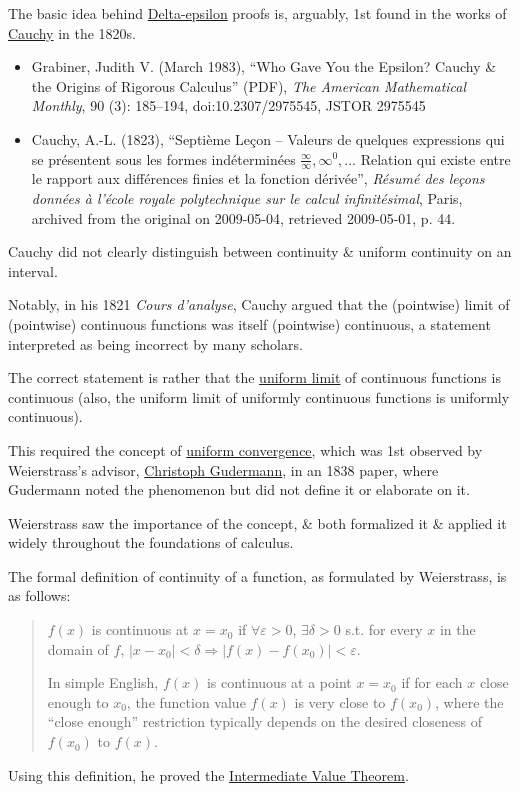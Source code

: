 \documentclass{article}
\begin{document}
%
The basic idea behind \href{https://en.wikipedia.org/wiki/(%CE%B5,_%CE%B4)-definition_of_limit}{Delta-epsilon} proofs is, arguably, 1st found in the works of \href{https://en.wikipedia.org/wiki/Augustin-Louis_Cauchy}{Cauchy} in the 1820s.
\begin{itemize}
	\item Grabiner, Judith V. (March 1983), ``Who Gave You the Epsilon? Cauchy \& the Origins of Rigorous Calculus'' (PDF), \textit{The American Mathematical Monthly}, 90 (3): 185--194, doi:10.2307/2975545, JSTOR 2975545
	\item Cauchy, A.-L. (1823), ``Septième Leçon – Valeurs de quelques expressions qui se présentent sous les formes indéterminées $\frac{\infty}{\infty},\infty^0,\ldots$ Relation qui existe entre le rapport aux différences finies et la fonction dérivée'', \textit{Résumé des leçons données à l'école royale polytechnique sur le calcul infinitésimal}, Paris, archived from the original on 2009-05-04, retrieved 2009-05-01, p. 44.
\end{itemize}
Cauchy did not clearly distinguish between continuity \& uniform continuity on an interval.

Notably, in his 1821 \textit{Cours d'analyse}, Cauchy argued that the (pointwise) limit of (pointwise) continuous functions was itself (pointwise) continuous, a statement interpreted as being incorrect by many scholars.

The correct statement is rather that the \href{https://en.wikipedia.org/wiki/Uniform_limit}{uniform limit} of continuous functions is continuous (also, the uniform limit of uniformly continuous functions is uniformly continuous).

This required the concept of \href{https://en.wikipedia.org/wiki/Uniform_convergence}{uniform convergence}, which was 1st observed by Weierstrass's advisor, \href{https://en.wikipedia.org/wiki/Christoph_Gudermann}{Christoph Gudermann}, in an 1838 paper, where Gudermann noted the phenomenon but did not define it or elaborate on it.

Weierstrass saw the importance of the concept, \& both formalized it \& applied it widely throughout the foundations of calculus.

%
The formal definition of continuity of a function, as formulated by Weierstrass, is as follows:
\begin{quotation}
	$f(x)$ is continuous at $x = x_0$ if $\forall\varepsilon > 0$, $\exists\delta > 0$ s.t. for every $x$ in the domain of $f$, $|x - x_0| < \delta\Rightarrow|f(x) - f(x_0)| < \varepsilon$.
	
	In simple English, $f(x)$ is continuous at a point $x = x_0$ if for each $x$ close enough to $x_0$, the function value $f(x)$ is very close to $f(x_0)$, where the ``close enough'' restriction typically depends on the desired closeness of $f(x_0)$ to $f(x)$.
\end{quotation}
Using this definition, he proved the \href{https://en.wikipedia.org/wiki/Intermediate_value_theorem}{Intermediate Value Theorem}.
\end{document}
